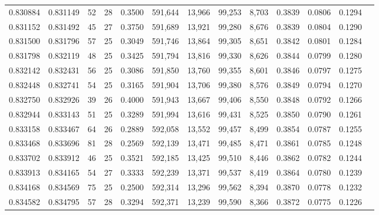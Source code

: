 \begin{tabular}{rrrrrrrrrrrrr}
0.830884 & 0.831149 &    52 &  28 &                                     0.3500 & 591,644 &  13,966 &  99,253 &   8,703 & 0.3839 & 0.0806 & 0.1294 \\
0.831152 & 0.831492 &    45 &  27 &                                     0.3750 & 591,689 &  13,921 &  99,280 &   8,676 & 0.3839 & 0.0804 & 0.1290 \\
0.831500 & 0.831796 &    57 &  25 &                                     0.3049 & 591,746 &  13,864 &  99,305 &   8,651 & 0.3842 & 0.0801 & 0.1284 \\
0.831798 & 0.832119 &    48 &  25 &                                     0.3425 & 591,794 &  13,816 &  99,330 &   8,626 & 0.3844 & 0.0799 & 0.1280 \\
0.832142 & 0.832431 &    56 &  25 &                                     0.3086 & 591,850 &  13,760 &  99,355 &   8,601 & 0.3846 & 0.0797 & 0.1275 \\
0.832448 & 0.832741 &    54 &  25 &                                     0.3165 & 591,904 &  13,706 &  99,380 &   8,576 & 0.3849 & 0.0794 & 0.1270 \\
0.832750 & 0.832926 &    39 &  26 &                                     0.4000 & 591,943 &  13,667 &  99,406 &   8,550 & 0.3848 & 0.0792 & 0.1266 \\
0.832944 & 0.833143 &    51 &  25 &                                     0.3289 & 591,994 &  13,616 &  99,431 &   8,525 & 0.3850 & 0.0790 & 0.1261 \\
0.833158 & 0.833467 &    64 &  26 &                                     0.2889 & 592,058 &  13,552 &  99,457 &   8,499 & 0.3854 & 0.0787 & 0.1255 \\
0.833468 & 0.833696 &    81 &  28 &                                     0.2569 & 592,139 &  13,471 &  99,485 &   8,471 & 0.3861 & 0.0785 & 0.1248 \\
0.833702 & 0.833912 &    46 &  25 &                                     0.3521 & 592,185 &  13,425 &  99,510 &   8,446 & 0.3862 & 0.0782 & 0.1244 \\
0.833913 & 0.834165 &    54 &  27 &                                     0.3333 & 592,239 &  13,371 &  99,537 &   8,419 & 0.3864 & 0.0780 & 0.1239 \\
0.834168 & 0.834569 &    75 &  25 &                                     0.2500 & 592,314 &  13,296 &  99,562 &   8,394 & 0.3870 & 0.0778 & 0.1232 \\
0.834582 & 0.834795 &    57 &  28 &                                     0.3294 & 592,371 &  13,239 &  99,590 &   8,366 & 0.3872 & 0.0775 & 0.1226 \\

\end{tabular}
